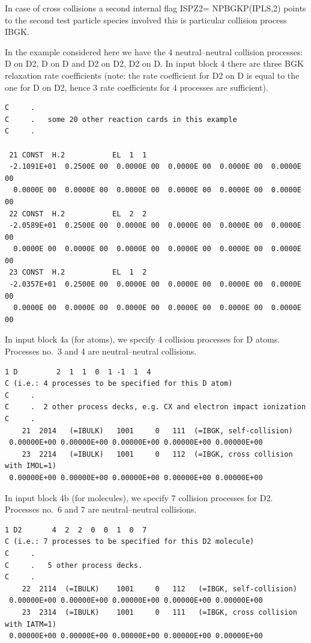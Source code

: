 In case of cross collisions a second internal flag ISPZ2= NPBGKP(IPLS,2) points
to the second test particle species involved this is particular collision
process IBGK.

\medskip

In the example considered here we have the 4 neutral--neutral collision
processes: D on D2,  D on D and D2 on D2, D2 on D.
In input block 4 there are three \ac{BGK} relaxation rate coefficients (note:
the rate coefficient for D2 on D is equal to the one for D on D2, hence 3 rate
coefficients
for 4 processes are sufficient).
\begin{footnotesize}
  \begin{lstlisting}
C     .
C     .   some 20 other reaction cards in this example
C     .

 21 CONST  H.2           EL  1  1
 -2.1091E+01  0.2500E 00  0.0000E 00  0.0000E 00  0.0000E 00  0.0000E 00
  0.0000E 00  0.0000E 00  0.0000E 00  0.0000E 00  0.0000E 00  0.0000E 00
 22 CONST  H.2           EL  2  2
 -2.0589E+01  0.2500E 00  0.0000E 00  0.0000E 00  0.0000E 00  0.0000E 00
  0.0000E 00  0.0000E 00  0.0000E 00  0.0000E 00  0.0000E 00  0.0000E 00
 23 CONST  H.2           EL  1  2
 -2.0357E+01  0.2500E 00  0.0000E 00  0.0000E 00  0.0000E 00  0.0000E 00
  0.0000E 00  0.0000E 00  0.0000E 00  0.0000E 00  0.0000E 00  0.0000E 00
\end{lstlisting}
\end{footnotesize}
In input block 4a (for atoms), we specify 4 collision processes for D atoms.
Processes no.\ 3 and 4 are neutral--neutral collisions.
\begin{scriptsize}
  \begin{lstlisting}
1 D         2  1  1  0  1 -1  1  4
C (i.e.: 4 processes to be specified for this D atom)
C     .
C     .  2 other process decks, e.g. CX and electron impact ionization
C     .
    21  2014   (=IBULK)   1001     0   111  (=IBGK, self-collision)
 0.00000E+00 0.00000E+00 0.00000E+00 0.00000E+00 0.00000E+00
    23  2214   (=IBULK)   1001     0   112  (=IBGK, cross collision with IMOL=1)
 0.00000E+00 0.00000E+00 0.00000E+00 0.00000E+00 0.00000E+00
\end{lstlisting}
\end{scriptsize}
In input block 4b (for molecules), we specify 7 collision processes for D2.
Processes no.\ 6 and 7 are neutral--neutral collisions.
\begin{scriptsize}
  \begin{lstlisting}
1 D2       4  2  2  0  0  1  0  7
C (i.e.: 7 processes to be specified for this D2 molecule)
C     .
C     .   5 other process decks.
C     .
    22  2114  (=IBULK)    1001     0   112   (=IBGK, self-collision)
 0.00000E+00 0.00000E+00 0.00000E+00 0.00000E+00 0.00000E+00
    23  2314  (=IBULK)    1001     0   111   (=IBGK, cross collision with IATM=1)
 0.00000E+00 0.00000E+00 0.00000E+00 0.00000E+00 0.00000E+00
\end{lstlisting}
\end{scriptsize}
